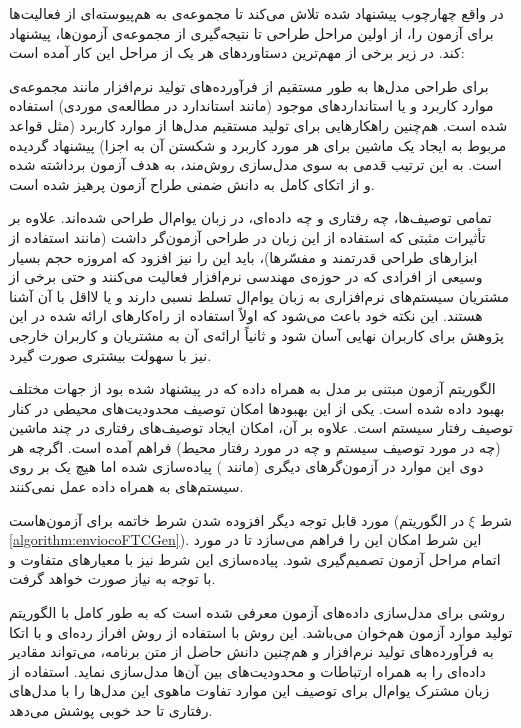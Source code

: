 در واقع چهارچوب پیشنهاد شده تلاش می‌کند تا مجموعه‌ی به هم‌پیوسته‌ای از فعالیت‌ها برای آزمون را، از اولین مراحل طراحی تا نتیجه‌گیری از مجموعه‌ی آزمون‌ها، پیشنهاد کند. در زیر برخی از مهم‌ترین دستاورد‌های هر یک از مراحل این کار آمده است:
\begin{strict_itemize}
\item برای طراحی مدل‌ها به طور مستقیم از فرآورده‌های تولید نرم‌افزار مانند مجموعه‌ی موارد کاربرد و یا استانداردهای موجود (مانند استاندارد  در مطالعه‌ی موردی) استفاده شده است. هم‌چنین راهکارهایی برای تولید مستقیم مدل‌ها از موارد کاربرد (مثل قواعد مربوط به ایجاد یک ماشین برای هر مورد کاربرد و شکستن آن به اجزا) پیشنهاد گردیده است. به این ترتیب قدمی به سوی مدل‌سازی روش‌مند، به هدف آزمون برداشته شده و از اتکای کامل  به دانش ضمنی طراح آزمون پرهیز شده است.

\item تمامی توصیف‌ها، چه رفتاری و چه داده‌ای، در زبان یوام‌ال طراحی شده‌اند. علاوه بر تأثیرات مثبتی که استفاده از این زبان در طراحی آزمون‌گر داشت (مانند استفاده از ابزارهای طراحی قدرتمند و مفسّرها)، باید این را نیز افزود که امروزه حجم بسیار وسیعی از افرادی که در حوزه‌ی مهندسی نرم‌افزار فعالیت می‌کنند و حتی برخی از مشتریان سیستم‌های نرم‌افزاری به زبان یوام‌ال تسلط نسبی دارند و یا لااقل با آن آشنا هستند. این نکته خود باعث می‌شود که اولاً استفاده از راه‌کارهای ارائه شده در این پژوهش برای کاربران نهایی آسان شود و ثانیاً ارائه‌ی آن به مشتریان و کاربران خارجی نیز با سهولت بیشتری صورت گیرد.

\item الگوریتم آزمون مبتنی بر مدل به همراه داده که در \cite{FTW05} پیشنهاد شده بود از جهات مختلف بهبود داده شده است. یکی از این بهبودها امکان توصیف محدودیت‌های محیطی در کنار توصیف رفتار سیستم است. علاوه بر آن، امکان ایجاد توصیف‌های رفتاری در چند ماشین (چه در مورد توصیف سیستم و چه در مورد رفتار محیط) فراهم آمده است. اگرچه هر دوی این موارد در آزمون‌گرهای دیگری (مانند ) پیاده‌سازی شده اما هیچ یک بر روی سیستم‌های به همراه داده عمل نمی‌کنند. 

مورد قابل توجه دیگر افزوده شدن شرط خاتمه برای آزمون‌هاست (شرط $\xi$ در الگوریتم \ref{algorithm:enviocoFTCGen}). این شرط امکان این را فراهم می‌سازد تا در مورد اتمام مراحل آزمون تصمیم‌گیری شود. پیاده‌سازی این شرط نیز با معیارهای متفاوت و با توجه به نیاز صورت خواهد گرفت.

\item روشی برای مدل‌سازی داده‌های آزمون معرفی شده است که به طور کامل با الگوریتم تولید موارد آزمون هم‌خوان می‌باشد. این روش با استفاده از روش افراز رده‌ای و با اتکا به فرآورده‌های تولید نرم‌افزار و هم‌چنین دانش حاصل از متن برنامه، می‌تواند مقادیر داده‌ای را به همراه ارتباطات و محدودیت‌های بین آن‌ها مدل‌سازی نماید. استفاده از زبان مشترک یو‌ام‌ال برای توصیف این موارد تفاوت ماهوی این مدل‌ها را با مدل‌های رفتاری تا حد خوبی پوشش می‌دهد.


\end{strict_itemize}
